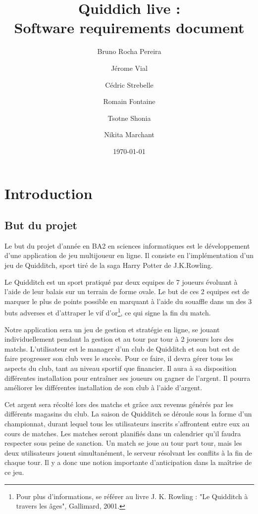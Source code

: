 \documentclass[a4paper]{article}
\title{Quiddich live : \\Software requirements document}
\author{Bruno Rocha Pereira \and Jérome Vial \and Cédric Strebelle \and
Romain Fontaine \and Tsotne Shonia \and Nikita Marchant}
\date{\today}
\begin{document}
\maketitle
\tableofcontents
\clearpage


\section{Introduction}
\subsection{But du projet}
Le but du projet d'année en BA2 en sciences informatiques est le développement d'une application de jeu multijoueur en ligne.
Il consiste en l'implémentation d'un jeu de Quidditch, sport tiré de la saga Harry Potter de J.K.Rowling.

 
Le Quidditch est un sport pratiqué par deux \glspl{equipe} de 7 \glspl{joueur} évoluant à l'aide de leur balais sur un terrain de forme ovale. Le but de ces 2 \glspl{equipe} est de marquer le plus de points possible en marquant à l'aide du souaffle dans un des 3 buts adverses et d'attraper le vif d'or\footnote{Pour plus d'informations, se référer au livre J. K. Rowling : "Le Quidditch à travers les âges", Gallimard, 2001.}, ce qui signe la fin du match. 


Notre application sera un jeu de gestion et stratégie en ligne, se jouant individuellement pendant la gestion et au tour par tour à 2 joueurs lors des matchs. L'\gls{utilisateur} est le \gls{manager} d'un \gls{club} de Quidditch et son but est de faire progresser son \gls{club} vers le succès. Pour ce faire, il devra gérer tous les aspects du \gls{club}, tant au niveau sportif que financier. Il aura à sa disposition différentes installation pour entraîner ses \glspl{joueur} ou gagner de l'argent. Il pourra améliorer les différentes installation de son \gls{club} à l'aide d'argent.

Cet argent sera récolté lors des matchs et grâce aux revenus générés par les différents magasins du \gls{club}. La saison de Quidditch se déroule sous la forme d'un championnat, durant lequel tous les \glspl{utilisateur} inscrits s'affrontent entre eux au cours de matches. Les matches seront planifiés dans un calendrier qu'il faudra respecter sous peine de sanction. Un match se joue au tour part tour, mais les deux \glspl{utilisateur} jouent simultanément, le \gls{serveur} résolvant les conflits à la fin de chaque tour. Il y a donc une notion importante d'anticipation dans la maîtrise de ce jeu.
\end{document}
